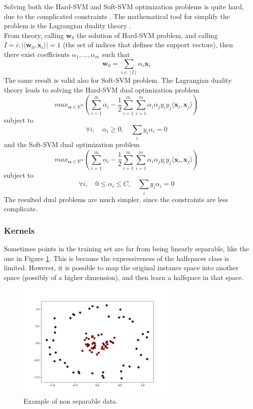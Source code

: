 Solving both the Hard-SVM and Soft-SVM optimization problems is quite hard, due to the complicated constraints \cite{Bottou06supportvector}. The mathematical tool for simplify the problem is the Lagrangian duality theory \cite{1886529043}.\\
From theory, calling $\mathbf{w}_0$ the solution of Hard-SVM problem, and calling $I = {i : |\langle \mathbf{w}_0, \mathbf{x}_i \rangle| = 1}$ (the set of indices that defines the support vectors), then there exist coefficients $\alpha_1, \dots, \alpha_m$ such that
\[ \mathbf{w}_0 = \sum_{i \in [I]} \alpha _i \mathbf{x}_i \]
The same result is valid also for Soft-SVM problem. The Lagrangian duality theory leads to solving the Hard-SVM dual optimization problem
\[ max_{\mathbf{\alpha} \in \mathbb{R}^m} \left( \sum_{i=1}^{m} \alpha_i -\frac{1}{2} \sum_{i=1}^{m} \sum_{i=1}^{m} \alpha_i \alpha_j y_i y_j \langle \mathbf{x}_i, \mathbf{x}_j \rangle \right) \]
subject to
\[ \forall i, \quad \alpha_i \ge 0 , \quad \sum_i y_i \alpha_i = 0 \]
and the Soft-SVM dual optimization problem
\[ max_{\mathbf{\alpha} \in \mathbb{R}^m} \left( \sum_{i=1}^{m} \alpha_i -\frac{1}{2} \sum_{i=1}^{m} \sum_{i=1}^{m} \alpha_i \alpha_j y_i y_j \langle \mathbf{x}_i, \mathbf{x}_j \rangle \right) \]
subject to
\[ \forall i, \quad 0 \le \alpha_i \le C , \quad \sum_i y_i \alpha_i = 0 \]
The resulted dual problems are much simpler, since the constraints are less complicate.\\

\subsubsection{Kernels}

Sometimes points in the training set are far from being linearly separable, like the one in Figure \ref{fig:kernel}. This is because the expressiveness of the halfspaces class is limited. However, it is possible to map the original instance space into another space (possibly of a higher dimension), and then learn a halfspace in that space.

\begin{figure}[ht]
	\centering
	\includegraphics[width=0.7\textwidth]{figures/kernel.png}
	\caption{Example of non separable data.}
	\label{fig:kernel}
\end{figure}

